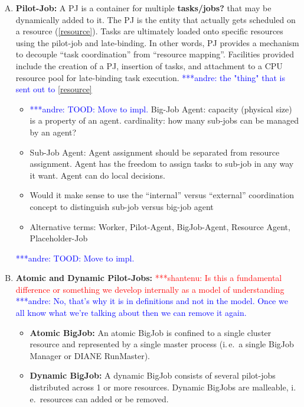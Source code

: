 \documentclass[]{article}
\newcommand{\jhanote}[1]{ {\textcolor{red} { ***shantenu: #1 }}}
\newcommand{\alnote}[1]{ {\textcolor{blue} { ***andre: #1 }}}
\newcommand{\alnote}[1]{}
\begin{document}
\begin{enumerate}[A.]
	\item\textbf{Pilot-Job:} A PJ is a container for multiple \textbf{tasks/jobs?} 
	that may be dynamically added to it. The PJ is the entity that actually gets 
	scheduled on a resource (\ref{resource}). Tasks are ultimately loaded onto 
	specific resources using the pilot-job and late-binding. In other words, PJ 
	provides a mechanism 
	to decouple “task coordination” from “resource mapping”. Facilities provided 
	include the creation of a PJ, insertion of tasks, and attachment to a CPU 
	resource pool for late-binding task execution. \alnote{ the "thing" that is 
	sent out to \ref{resource}} \label{pilot-agent}    	
	\begin{itemize}
	    \item \alnote{TOOD: Move to impl.} Big-Job Agent: capacity (physical size) is a property of an agent. 
    	cardinality: how many sub-jobs can be managed by an agent?
    	\item Sub-Job Agent: Agent assignment should be separated from resource 
    	assignment. Agent has the freedom to assign tasks to sub-job in any way 
    	it want. Agent can do local decisions.    
      \item Would it make sense to use the ``internal'' versus
        ``external'' coordination concept to distinguish sub-job
        versus big-job agent
    	\item Alternative terms:  Worker, Pilot-Agent, BigJob-Agent, Resource 
    	Agent, Placeholder-Job
	\end{itemize}
	  \alnote{TOOD: Move to impl.}
      \item \textbf{Atomic and Dynamic Pilot-Jobs:} \jhanote{Is this a
          fundamental difference or something we develop internally as
          a model of understanding}\alnote{No, that's why it is in definitions 
          and not in the model. Once we all know what we're talking about then 
          we can  remove it again.}
	\begin{itemize}
	   \item  \textbf{Atomic BigJob:} An atomic BigJob is confined to a single 
	   cluster resource and represented by a single master process (i.\,e.\ a 
	   single BigJob Manager or DIANE RunMaster).
    	\item \textbf{Dynamic BigJob:} A dynamic BigJob consists of several 
    	pilot-jobs distributed across 1 or more resources. Dynamic BigJobs are 
    	malleable, i.\,e.\ resources can added or be removed.
	\end{itemize}	

\end{enumerate}
\end{document}
